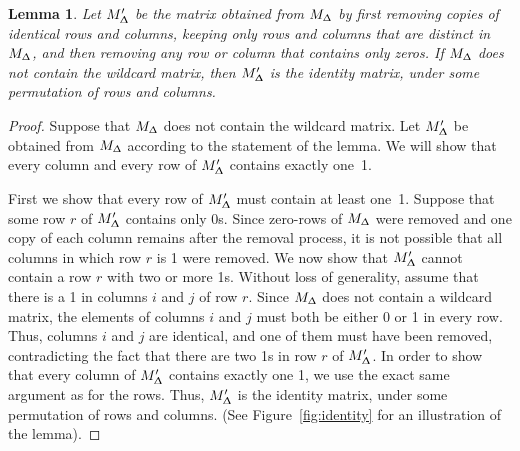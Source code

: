 \documentclass{article}
\renewcommand{\Delta}{\Updelta}
\theoremstyle{plain}
\newtheorem{lemma}[theorem]{Lemma}
\theoremstyle{definition}
\begin{document}
\begin{lemma}
    \label{lem:identity}
    Let $M'_{\Delta}$ be the matrix obtained from $M_{\Delta}$ by first removing copies of identical rows and columns, keeping only rows and columns that are distinct in $M_{\Delta}$, and then removing any row or column that contains only zeros. If $M_{\Delta}$ does not contain the wildcard matrix, then $M'_{\Delta}$ is the identity matrix, under some permutation of rows and columns.
\end{lemma}
\begin{proof}
    Suppose that $M_{\Delta}$ does not contain the wildcard matrix. Let $M'_{\Delta}$ be obtained from $M_{\Delta}$ according to the statement of the lemma. We will show that every column and every row of $M'_{\Delta}$ contains exactly one~1.

    First we show that every row of $M'_{\Delta}$ must contain at least one~1. Suppose that some row $r$ of $M'_{\Delta}$ contains only 0s. Since zero-rows of $M_{\Delta}$ were removed and one copy of each column remains after the removal process, it is not possible that all columns in which row $r$ is 1 were removed. We now show that $M'_{\Delta}$ cannot contain a row $r$ with two or more 1s. Without loss of generality, assume that there is a 1 in columns $i$ and $j$ of row $r$. Since $M_{\Delta}$ does not contain a wildcard matrix, the elements of columns $i$ and $j$ must both be either 0 or 1 in every row. Thus, columns $i$ and $j$ are identical, and one of them must have been removed, contradicting the fact that there are two 1s in row $r$ of $M'_{\Delta}$. In order to show that every column of $M'_{\Delta}$ contains exactly one 1, we use the exact same argument as for the rows. Thus, $M'_{\Delta}$ is the identity matrix, under some permutation of rows and columns. (See Figure~\ref{fig:identity} for an illustration of the lemma).
\end{proof}
\end{document}
